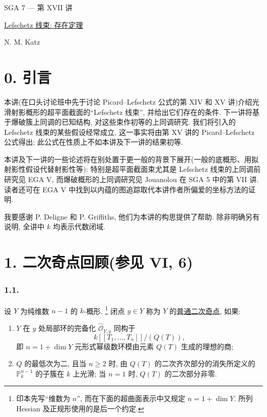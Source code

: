\clearpage
\ExposeTOC
\begin{center}
{\large SGA 7 --- 第 XVII 讲}\par
\vspace{2em}
{\Large\underline{Lefschetz 线束: 存在定理}}\par
\vspace{1.5em}
{\large N. M. Katz}
\end{center}

\section*{0. 引言}

本讲(在口头讨论班中先于讨论 Picard--Lefschetz 公式的第 XIV 和 XV 讲)介绍光滑射影概形的超平面截面的“Lefschetz 线束”, 并给出它们存在的条件. 下一讲将基于爆破簇上同调的已知结构, 对这些束作初等的上同调研究. 我们将引入的 Lefschetz 线束的某些假设经常成立, 这一事实将由第 XV 讲的 Picard--Lefschetz 公式得出; 此公式在性质上不如本讲及下一讲的结果初等.

本讲及下一讲的一些论述将在别处置于更一般的背景下展开(一般的底概形、用拟射影性假设代替射影性等): 特别是超平面截面束尤其是 Lefschetz 线束的上同调前研究见 EGA V, 而爆破概形的上同调研究见 Jouanolou 在 SGA 5 中的第 VII 讲. 读者还可在 EGA V 中找到以内蕴的图追踪取代本讲作者所偏爱的坐标方法的证明.

我要感谢 P. Deligne 和 P. Griffiths, 他们为本讲的构思提供了帮助. 除非明确另有说明, 全讲中 $k$ 均表示代数闭域.

\section*{1. 二次奇点回顾(参见 VI, 6)}

\subsubsection*{1.1.}
设 $Y$ 为纯维数 $n-1$ 的 $k$-概形.
\footnote{印本先写“维数为 $n$”, 而在下面的超曲面表示中又规定 $n=1+\dim Y$. 所列 Hessian 及正规形使用的是后一个约定.}
闭点 $y\in Y$ 称为 $Y$ 的\underline{普通二次奇点}, 如果:
\begin{enumerate}
\item[(a)] $Y$ 在 $y$ 处局部环的完备化 $\widehat{\mathcal O}_{Y,y}$ 同构于
\[
k[[T_1,\ldots,T_n]]/(Q(T)),
\]
即 $n=1+\dim Y$ 元形式幂级数环模由元素 $Q(T)$ 生成的理想的商;
\item[(b)] $Q$ 的最低次为二, 且当 $n\geq2$ 时, 由 $Q(T)$ 的二次齐次部分的消失所定义的 $\mathbb P^{n-1}_k$ 的子簇在 $k$ 上光滑; 当 $n=1$ 时, $Q(T)$ 的二次部分非零.
\end{enumerate}

